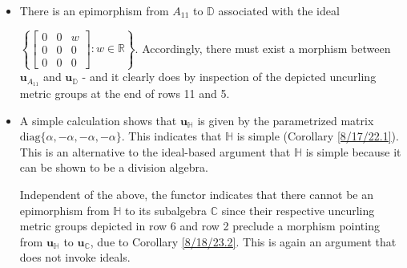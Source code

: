 \documentclass{amsart}
\numberwithin{equation}{section}
\theoremstyle{definition}
\numberwithin{theorem}{section}
\begin{document}
\begin{itemize}
 $\left\{\left[\begin{array}{ccc}
0  & 0 & w   \\
 0 & 0 & v \\
 0 & 0 & 0    
\end{array}\right]:w,v\in\mathbb{R}\right\}$.
The functor then implies that there must exist a morphism from $\mathbf{u}_{A_{12}}$ to $\mathbf{u}_{\mathbb{D}}$.  Indeed, existence of the latter morphism is obvious from the last entries in rows 12 and 5 of Table I. 
\item There is an epimorphism from $A_{11}$ to $\mathbb{D}$ associated with the ideal 

 $ \left\{\left[\begin{array}{ccc}
0  & 0 & w   \\
 0 & 0 & 0 \\
 0 & 0 & 0    
\end{array}\right]:w\in\mathbb{R} \right\} $. Accordingly, there must exist a morphism between $\mathbf{u}_{A_{11}}$ and $\mathbf{u}_{\mathbb{D}}$  - and it clearly does by inspection of the depicted uncurling metric groups at the end of rows 11 and 5.  
\item A simple calculation shows that $\mathbf{u}_{\mathbb{H}}$ is given by the parametrized matrix $\text{diag}\{\alpha,-\alpha,-\alpha,-\alpha\}$.  This indicates that  $\mathbb{H}$ is simple (Corollary \ref{8/17/22.1}).  This is an alternative to the ideal-based argument that $\mathbb{H}$ is simple because it can be shown to be a division algebra.


 Independent of the above, the functor indicates that there cannot be an epimorphism from  $\mathbb{H}$ to its subalgebra $\mathbb{C}$ since 	their respective uncurling metric groups depicted in row 6 and row 2 preclude a morphism pointing from $\mathbf{u}_{\mathbb{H}}$ to $\mathbf{u}_{\mathbb{C}}$, due to Corollary \ref{8/18/23.2}.  This is again an argument that does not invoke ideals.\end{itemize}
\end{document}
